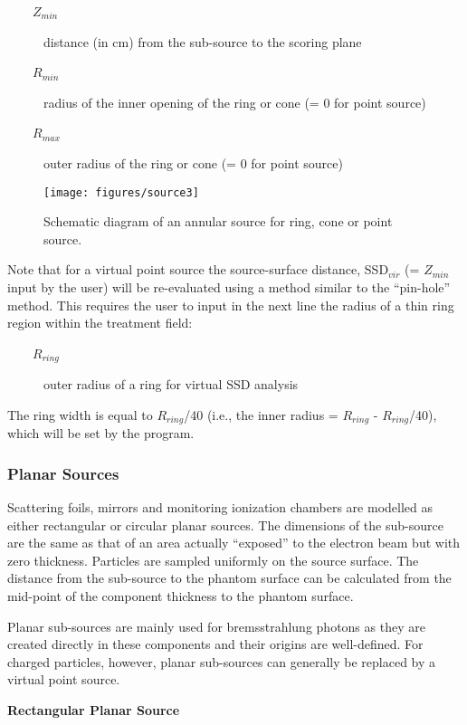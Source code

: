 \documentclass[12pt,twoside]{article}
\begin{document}
\begin{description}
\item [~~~~$Z_{min}$] distance (in cm) from the sub-source to the scoring plane
\item [~~~~$R_{min}$] radius of the inner opening of the ring or cone (= 0 for point source)
\item [~~~~$R_{max}$] outer radius of the ring or cone (= 0 for point source)
\end{description}

\begin{figure}[htbp]
\texttt{[image: figures/source3]}
\caption[]
{Schematic diagram of an annular source for ring, cone or point source. }
\label{source3}
\end{figure}

Note that for a virtual point source the source-surface distance, SSD$_{vir}$ (= $Z_{min}$ input by the user) will be re-evaluated using a method similar to the ``pin-hole'' method\cite{Ma95c}. This requires the user to input in the next line the radius of a thin ring region within the treatment field:

\begin{description}
\item [~~~~$R_{ring}$] outer radius of a  ring for virtual SSD analysis
\end{description}

The ring width is equal to $R_{ring}$/40 (i.e., the inner radius = $R_{ring}$ - $R_{ring}$/40), which will be set by the program.

\subsubsection{Planar Sources}
Scattering foils, mirrors and monitoring ionization chambers are modelled
as either rectangular or circular planar sources. The dimensions of the
sub-source are the same as that of an area actually ``exposed'' to the
electron beam but with zero thickness. Particles are sampled uniformly on
the source surface. The distance from the sub-source to the phantom
surface can be calculated from the mid-point of the component thickness to
the phantom surface.

Planar sub-sources are mainly used for bremsstrahlung photons as they are
created directly in these components and their origins are well-defined.
For charged particles, however, planar sub-sources can generally be
replaced by a virtual point source.

{\bf Rectangular Planar Source}
\end{document}
